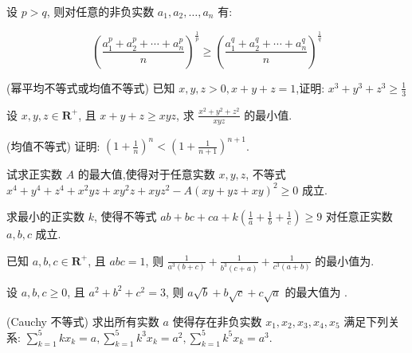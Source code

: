 \documentclass[a4paper , final]{ctexart}
\newenvironment{problem}[1]{%
  \item #1
  \par
  \vspace{8cm}
}{}
\begin{document}
设 $p>q$, 则对任意的非负实数 $a_1,a_2,\ldots,a_n$ 有:

\begin{equation*}
  \left(\frac{a_1^p+a_2^p+\cdots+a_n^p}{n}\right)^{\frac{1}{p}} \geq \left(\frac{a_1^q+a_2^q+\cdots+a_n^q}{n}\right)^{\frac{1}{q}}
\end{equation*}

\begin{problems}
  \begin{problem}
    {(幂平均不等式或均值不等式)
      已知 $x,y,z>0,x+y+z=1$,证明: $x^3+y^3+z^3\geq \frac{1}{3}$
    }
  \end{problem}

  \begin{problem}
    {
      设 $x,y,z\in\mathbf{R}^+$, 且 $x+y+z\ge xyz$, 求 $\frac{x^2+y^2+z^2}{xyz}$ 的最小值.
    }
  \end{problem}

  \begin{problem}
    {(均值不等式)
      证明: $\left(1+\frac{1}{n}\right)^n < \left(1+\frac{1}{n+1}\right)^{n+1}$.
    }
  \end{problem}

  \begin{problem}
    {
      试求正实数 $A$ 的最大值,使得对于任意实数 $x,y,z$, 不等式 $x^4+y^4+z^4+x^2yz+xy^2z+xyz^2-A(xy+yz+xy)^2\ge 0$ 成立.
    }
  \end{problem}

  \begin{problem}
    {
      求最小的正实数 $k$, 使得不等式 $ab+bc+ca+k\left(\frac{1}{a}+\frac{1}{b}+\frac{1}{c}\right)\geq 9$ 对任意正实数 $a,b,c$ 成立.
    }
  \end{problem}

  \begin{problem}
    {
      已知 $a,b,c\in \mathbf{R}^+$, 且 $abc=1$, 则 $\frac{1}{a^3(b+c)}+\frac{1}{b^3(c+a)}+\frac{1}{c^3(a+b)}$ 的最小值为\underline{\hspace{3cm}}.
    }
  \end{problem}

  \begin{problem}
    {
      设 $a,b,c\ge 0$, 且 $a^2+b^2+c^2=3$, 则 $a\sqrt{b}+b\sqrt{c}+c\sqrt{a}$ 的最大值为 \underline{\hspace{3cm}}.
    }
  \end{problem}

  \begin{problem}
    {(Cauchy 不等式)
      求出所有实数 $a$ 使得存在非负实数 $x_1,x_2,x_3,x_4,x_5$ 满足下列关系: $\sum_{k=1}^5 kx_k=a,\sum_{k=1}^5 k^3x_k =a^2,\sum_{k=1}^5 k^5x_k =a^3$.
    }
  \end{problem}


\end{problems}
\end{document}
